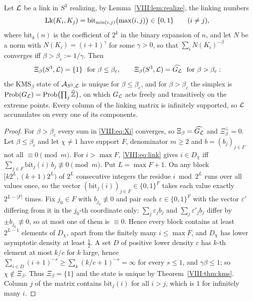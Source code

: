 \begin{theorem}\label{VIII:thm:BC}
Let $\mathcal{L}$ be a link in $S^3$ realizing, by Lemma~\ref{VIII:lem:realize}, the linking numbers
\[
\operatorname{Lk}(K_i,K_j)=\mathrm{bit}_{\min(i,j)}\bigl(\max(i,j)\bigr)\in\{0,1\}\qquad(i\ne j),
\]
where $\mathrm{bit}_k(n)$ is the coefficient of $2^k$ in the binary expansion of $n$, and
let $N$ be a norm with $N(K_i)=(i+1)^\gamma$ for some $\gamma>0$, so that
$\sum_iN(K_i)^{-\beta}$ converges iff $\beta>\beta_c:=1/\gamma$. Then
\[
\Xi_\beta(S^3,\mathcal{L})=\{1\}\ \text{ for }\beta\le\beta_c,\qquad
\Xi_\beta(S^3,\mathcal{L})=\widehat{G_{\mathcal{L}}}\ \text{ for }\beta>\beta_c :
\]
the $\mathrm{KMS}_\beta$ state of $\mathcal{A}_{S^3,\mathcal{L}}$ is unique for $\beta\le\beta_c$, and for
$\beta>\beta_c$ the simplex is $\mathrm{Prob}(G_{\mathcal{L}})=\mathrm{Prob}\bigl(\prod_j\widehat{\mathbb{Z}}\bigr)$, on which $G_{\mathcal{L}}$
acts freely and transitively on the extreme points. Every column of the linking matrix is
infinitely supported, so $\mathcal{L}$ accumulates on every one of its components.
\end{theorem}

\begin{proof}
For $\beta>\beta_c$ every sum in \eqref{VIII:eq:Xi} converges, so $\Xi_\beta=\widehat{G_{\mathcal{L}}}$ and
$\Xi_\beta^\perp=0$. Let $\beta\le\beta_c$ and let $\chi\ne1$ have support $F$, denominator
$m\ge2$ and $b=(b_j)_{j\in F}$ not all $\equiv0\pmod m$. For $i>\max F$, \eqref{VIII:eq:link} gives
$i\in D_\chi$ iff $\sum_{j\in F}\mathrm{bit}_j(i)\,b_j\not\equiv0\pmod m$. Put $L=\max F+1$.
On any block $[k2^L,(k+1)2^L)$ of $2^L$ consecutive integers the residue $i\bmod 2^L$ runs
over all values once, so the vector $(\mathrm{bit}_j(i))_{j\in F}\in\{0,1\}^F$ takes each value
exactly $2^{L-|F|}$ times. Fix $j_0\in F$ with $b_{j_0}\not\equiv0$ and pair each
$\varepsilon\in\{0,1\}^F$ with the vector $\varepsilon'$ differing from it in the $j_0$-th
coordinate only: $\sum_j\varepsilon_jb_j$ and $\sum_j\varepsilon'_jb_j$ differ by
$\pm b_{j_0}\not\equiv0$, so at most one of them is $\equiv0$. Hence every block contains at
least $2^{L-1}$ elements of $D_\chi$, apart from the finitely many $i\le\max F$, and $D_\chi$
has lower asymptotic density at least $\frac12$. A set $D$ of positive lower density $c$ has
$k$-th element at most $k/c$ for $k$ large, hence
$\sum_{i\in D}(i+1)^{-s}\ge\sum_k(k/c+1)^{-s}=\infty$ for every $s\le1$, and $\gamma\beta\le1$;
so $\chi\notin\Xi_\beta$. Thus $\Xi_\beta=\{1\}$ and the state is unique by
Theorem~\ref{VIII:thm:kms}. Column $j$ of the matrix contains $\mathrm{bit}_j(i)$ for all $i>j$,
which is $1$ for infinitely many $i$.
\end{proof}

